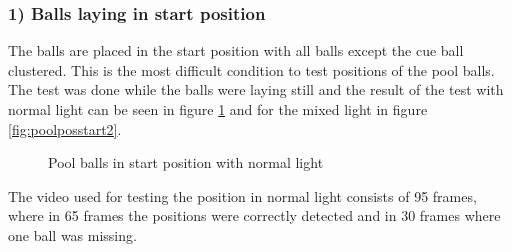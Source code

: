 \subsubsection{ 1) Balls laying in start position}
The balls are placed in the start position with all balls except the cue ball clustered. This is the most difficult condition to test positions of the pool balls. The test was done while the balls were laying still and the result of the test with normal light can be seen in figure \ref{fig:poolposstart} and for the mixed light in figure \ref{fig:poolposstart2}.

\begin{figure}[H]
  \centering
\quad
\quad
   \caption{Pool balls in start position with normal light}
  \label{fig:poolposstart}
\end{figure}

The video used for testing the position in normal light consists of 95 frames, where in 65 frames the positions were correctly detected and in 30 frames where one ball was missing.

